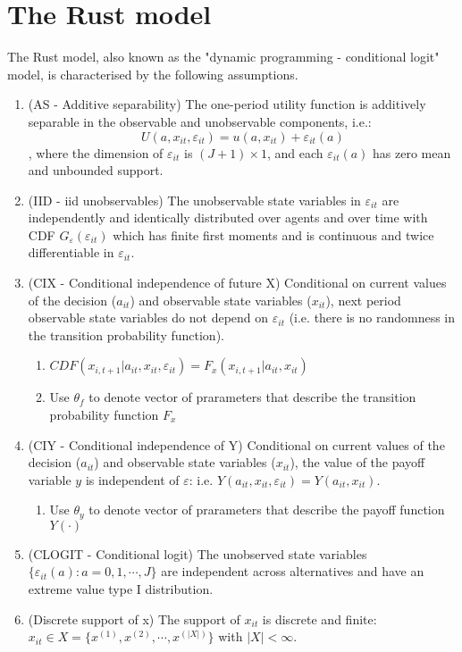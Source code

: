 \documentclass[11pt]{article}
\begin{document}
\section{The Rust model}

The Rust model, also known as the "dynamic programming - conditional logit" model, is characterised by the following assumptions.

\begin{enumerate}
    \item (AS - Additive separability) The one-period utility function is additively separable in the observable and unobservable components, i.e.:
    \begin{equation*}
        U(a,x_{it},\varepsilon_{it}) = u(a,x_{it}) + \varepsilon_{it}(a)
    \end{equation*}
    , where the dimension of $\varepsilon_{it}$ is $(J+1) \times 1$, and each $\varepsilon_{it}(a)$ has zero mean and unbounded support.
    \item (IID - iid unobservables) The unobservable state variables in $\varepsilon_{it}$ are independently and identically distributed over agents and over time with CDF $G_\varepsilon(\varepsilon_{it})$ which has finite first moments and is continuous and twice differentiable in $\varepsilon_{it}$.
    \item (CIX - Conditional independence of future X) Conditional on current values of the decision ($a_{it}$) and observable state variables ($x_{it}$), next period observable state variables do not depend on $\varepsilon_{it}$ (i.e. there is no randomness in the transition probability function).
    \begin{enumerate}
        \item $CDF(x_{i,t+1}|a_{it},x_{it},\varepsilon_{it}) = F_x(x_{i,t+1}|a_{it},x_{it})$
        \item Use $\theta_f$ to denote vector of prarameters that describe the transition probability function $F_x$
    \end{enumerate}
    \item (CIY - Conditional independence of Y) Conditional on current values of the decision ($a_{it}$) and observable state variables ($x_{it}$), the value of the payoff variable $y$ is independent of $\varepsilon$: i.e. $Y(a_{it},x_{it},\varepsilon_{it}) = Y(a_{it},x_{it})$.
    \begin{enumerate}
        \item Use $\theta_y$ to denote vector of prarameters that describe the payoff function $Y(\cdot)$
    \end{enumerate}
    \item (CLOGIT - Conditional logit) The unobserved state variables $\{\varepsilon_{it}(a): a = 0,1,\cdots,J\}$ are independent across alternatives and have an extreme value type I distribution.
    \item (Discrete support of x) The support of $x_{it}$ is discrete and finite: $x_{it} \in X = \{x^{(1)},x^{(2)},\cdots,x^{(|X|)}\}$ with $|X| < \infty$.
\end{enumerate}
\end{document}
